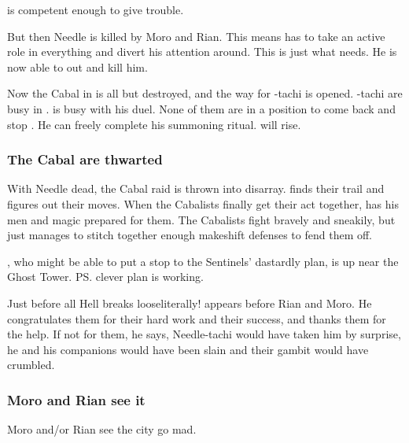 \Paerzim{} is competent enough to give \Psyrex{} trouble. 

But then Needle is killed by Moro and Rian. 
This means \Paerzim{} has to take an active role in everything and divert his attention around. 
This is just what \Psyrex{} needs. 
He is now able to out\manoeuvre \Paerzim{} and kill him. 

Now the Cabal in \Malcur is all but destroyed, and the way for \Psyrex-tachi is opened. 
\Achsah-tachi are busy in \Forclin. 
\Teshrial{} is busy with his duel. 
None of them are in a position to come back and stop \Psyrex. 
He can freely complete his summoning ritual. 
\Nithdornazsh{} will rise. 





\subsubsection{The Cabal are thwarted}
With Needle dead, the Cabal raid is thrown into disarray. 
\Psyrex{} finds their trail and figures out their moves. 
When the Cabalists finally get their act together, \Psyrex{} has his men and magic prepared for them. 
The Cabalists fight bravely and sneakily, but \Psyrex{} just manages to stitch together enough makeshift defenses to fend them off. 

\Achsah, who might be able to put a stop to the Sentinels' dastardly plan, is up near the Ghost Tower. \ps{\Secherdamon} clever plan is working. 

Just before all Hell breaks loose\dash literally!\dash\Psyrex{} appears before Rian and Moro. He congratulates them for their hard work and their success, and thanks them for the help. If not for them, he says, Needle-tachi would have taken him by surprise, he and his companions would have been slain and their gambit would have crumbled. 







\subsubsection{Moro and Rian see it}
Moro \Cobrel and/or Rian see the city go mad. 


